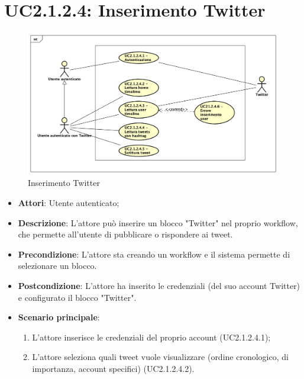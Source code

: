 \section{UC2.1.2.4: Inserimento Twitter}
\label{UC2.1.2.4}
\begin{figure}[h]
	\centering
	\includegraphics[scale=0.4]{Diagram/Twitter.png}
	\caption{Inserimento Twitter}\label{}
\end{figure}
\begin{itemize}
	\item \textbf{Attori}: Utente autenticato;
	\item \textbf{Descrizione}: L'attore può inserire un blocco "Twitter" nel proprio workflow, che permette all'utente di pubblicare o rispondere ai tweet.
	\item \textbf{Precondizione}: L'attore sta creando un workflow e il sistema permette di selezionare un blocco.
	\item \textbf{Postcondizione}: L'attore ha inserito le credenziali (del suo account Twitter) e configurato il blocco "Twitter".
	\item \textbf{Scenario principale}:
	\begin{enumerate} 
		\item  L'attore inserisce le credenziali del proprio account (UC2.1.2.4.1);  
		\item  L'attore seleziona quali tweet vuole visualizzare (ordine cronologico, di importanza, account specifici) (UC2.1.2.4.2).
	\end{enumerate}
\end{itemize}


